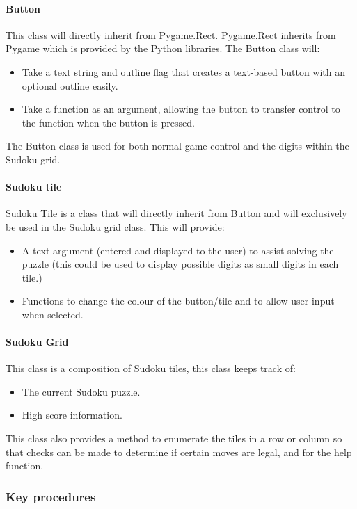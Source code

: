\documentclass[fleqn]{article}
\begin{document}
\paragraph{Button}
This class will directly inherit from Pygame.Rect. Pygame.Rect inherits from Pygame which is provided by the Python libraries. The Button class will:
\begin{itemize}
\item Take a text string and outline flag that creates a text-based button with an optional outline easily.
\item Take a function as an argument, allowing the button to transfer control to the function when the button is pressed.
\end{itemize}
The Button class is used for both normal game control and the digits within the Sudoku grid.
\paragraph{Sudoku tile}
Sudoku Tile is a class that will directly inherit from Button and will exclusively be used in the Sudoku grid class. This will provide:
\begin{itemize}
\item A text argument (entered and displayed to the user) to assist solving the puzzle (this could be used to display possible digits as small digits in each tile.)
\item Functions to change the colour of the button/tile and to allow user input when selected.
\end{itemize}
\paragraph{Sudoku Grid}
This class is a composition of Sudoku tiles, this class keeps track of:
\begin{itemize}
\item The current Sudoku puzzle.
\item High score information.
\end{itemize}
This class also provides a method to enumerate the tiles in a row or column so that checks can be made to determine if certain moves are legal, and for the help function.

\subsubsection{Key procedures}
 
\end{document}
